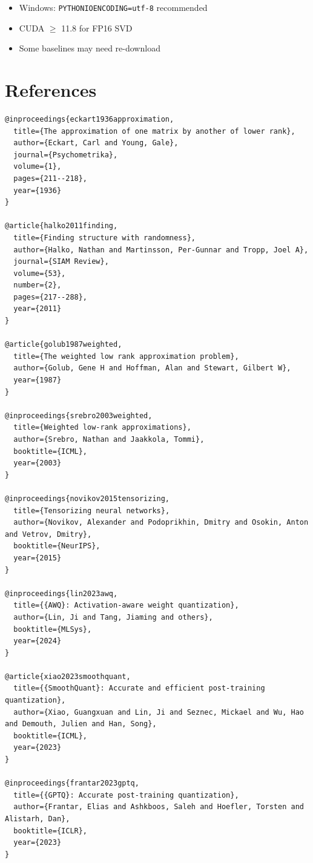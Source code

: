 \begin{itemize}
\item Windows: \texttt{PYTHONIOENCODING=utf-8} recommended
\item CUDA $\ge$ 11.8 for FP16 SVD
\item Some baselines may need re-download
\end{itemize}


\section{References}

\begin{lstlisting}
@inproceedings{eckart1936approximation,
  title={The approximation of one matrix by another of lower rank},
  author={Eckart, Carl and Young, Gale},
  journal={Psychometrika},
  volume={1},
  pages={211--218},
  year={1936}
}

@article{halko2011finding,
  title={Finding structure with randomness},
  author={Halko, Nathan and Martinsson, Per-Gunnar and Tropp, Joel A},
  journal={SIAM Review},
  volume={53},
  number={2},
  pages={217--288},
  year={2011}
}

@article{golub1987weighted,
  title={The weighted low rank approximation problem},
  author={Golub, Gene H and Hoffman, Alan and Stewart, Gilbert W},
  year={1987}
}

@inproceedings{srebro2003weighted,
  title={Weighted low-rank approximations},
  author={Srebro, Nathan and Jaakkola, Tommi},
  booktitle={ICML},
  year={2003}
}

@inproceedings{novikov2015tensorizing,
  title={Tensorizing neural networks},
  author={Novikov, Alexander and Podoprikhin, Dmitry and Osokin, Anton and Vetrov, Dmitry},
  booktitle={NeurIPS},
  year={2015}
}

@inproceedings{lin2023awq,
  title={{AWQ}: Activation-aware weight quantization},
  author={Lin, Ji and Tang, Jiaming and others},
  booktitle={MLSys},
  year={2024}
}

@article{xiao2023smoothquant,
  title={{SmoothQuant}: Accurate and efficient post-training quantization},
  author={Xiao, Guangxuan and Lin, Ji and Seznec, Mickael and Wu, Hao and Demouth, Julien and Han, Song},
  booktitle={ICML},
  year={2023}
}

@inproceedings{frantar2023gptq,
  title={{GPTQ}: Accurate post-training quantization},
  author={Frantar, Elias and Ashkboos, Saleh and Hoefler, Torsten and Alistarh, Dan},
  booktitle={ICLR},
  year={2023}
}


\end{lstlisting}
